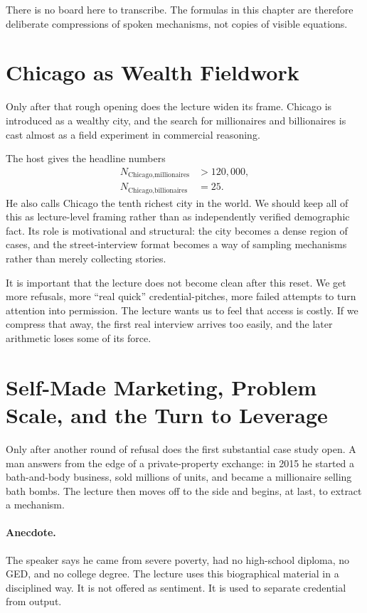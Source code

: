 \begin{remark}
There is no board here to transcribe. The formulas in this chapter are therefore deliberate compressions of spoken mechanisms, not copies of visible equations.
\end{remark}

\section{Chicago as Wealth Fieldwork}

Only after that rough opening does the lecture widen its frame. Chicago is introduced as a wealthy city, and the search for millionaires and billionaires is cast almost as a field experiment in commercial reasoning.

The host gives the headline numbers
\begin{align}
N_{\text{Chicago,millionaires}} &> 120{,}000,\\
N_{\text{Chicago,billionaires}} &= 25.
\end{align}
He also calls Chicago the tenth richest city in the world. We should keep all of this as lecture-level framing rather than as independently verified demographic fact. Its role is motivational and structural: the city becomes a dense region of cases, and the street-interview format becomes a way of sampling mechanisms rather than merely collecting stories.

It is important that the lecture does not become clean after this reset. We get more refusals, more ``real quick'' credential-pitches, more failed attempts to turn attention into permission. The lecture wants us to feel that access is costly. If we compress that away, the first real interview arrives too easily, and the later arithmetic loses some of its force.

\section{Self-Made Marketing, Problem Scale, and the Turn to Leverage}

Only after another round of refusal does the first substantial case study open. A man answers from the edge of a private-property exchange: in 2015 he started a bath-and-body business, sold millions of units, and became a millionaire selling bath bombs. The lecture then moves off to the side and begins, at last, to extract a mechanism.

\paragraph{Anecdote.}
The speaker says he came from severe poverty, had no high-school diploma, no GED, and no college degree. The lecture uses this biographical material in a disciplined way. It is not offered as sentiment. It is used to separate credential from output.

